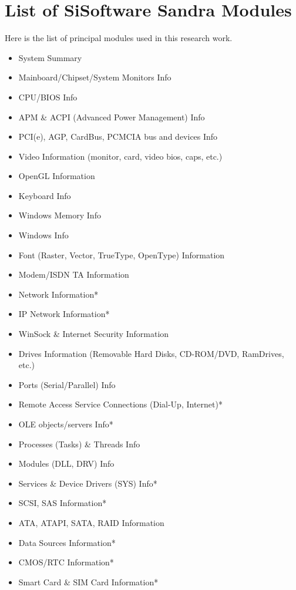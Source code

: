 

\chapter{List of SiSoftware Sandra Modules} \label{app:sandra_modules}

Here is the list of principal modules used in this research work.
\begin{itemize}
    \item System Summary
    \item Mainboard/Chipset/System Monitors Info
    \item CPU/BIOS Info
    \item APM \& ACPI (Advanced Power Management) Info
    \item PCI(e), AGP, CardBus, PCMCIA bus and devices Info
    \item Video Information (monitor, card, video bios, caps, etc.)
    \item OpenGL Information
    \item Keyboard Info
    \item Windows Memory Info
    \item Windows Info
    \item Font (Raster, Vector, TrueType, OpenType) Information
    \item Modem/ISDN TA Information
    \item Network Information*
    \item IP Network Information*
    \item WinSock \& Internet Security Information
    \item Drives Information (Removable Hard Disks, CD-ROM/DVD, RamDrives, etc.)
    \item Ports (Serial/Parallel) Info
    \item Remote Access Service Connections (Dial-Up, Internet)*
    \item OLE objects/servers Info*
    \item Processes (Tasks) \& Threads Info
    \item Modules (DLL, DRV) Info
    \item Services \& Device Drivers (SYS) Info*
    \item SCSI, SAS Information*
    \item ATA, ATAPI, SATA, RAID Information
    \item Data Sources Information*
    \item CMOS/RTC Information*
    \item Smart Card \& SIM Card Information*
\end{itemize}
    
